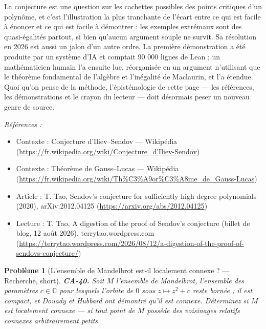 \documentclass[11pt]{article}
\newtheorem{problem}{Problème}
\newenvironment{refs}{\par\small\noindent\emph{Références :}\begin{itemize}\setlength\itemsep{0pt}}{\end{itemize}\normalsize}
\begin{document}
\noindent La conjecture est une question sur les cachettes possibles des points critiques
d'un polynôme, et c'est l'illustration la plus tranchante de l'écart entre ce qui est facile à
énoncer et ce qui est facile à démontrer : les exemples extrémaux sont des quasi-égalités partout,
si bien qu'aucun argument souple ne survit. Sa résolution en 2026 est aussi un jalon d'un autre
ordre. La première démonstration a été produite par un système d'IA et comptait 90 000 lignes de
Lean ; un mathématicien humain l'a ensuite lue, réorganisée en un argument n'utilisant que le
théorème fondamental de l'algèbre et l'inégalité de Maclaurin, et l'a étendue. Quoi qu'on pense de
la méthode, l'épistémologie de cette page --- les références, les démonstrations et le crayon du
lecteur --- doit désormais peser un nouveau genre de source.

\begin{refs}
\item Contexte : Conjecture d'Iliev--Sendov --- Wikipédia (\url{https://fr.wikipedia.org/wiki/Conjecture_d'Iliev-Sendov})
\item Contexte : Théorème de Gauss--Lucas --- Wikipédia (\url{https://fr.wikipedia.org/wiki/Th%C3%A9or%C3%A8me_de_Gauss-Lucas})
\item Article : T. Tao, \og{} Sendov's conjecture for sufficiently high degree polynomials \fg{} (2020), arXiv:2012.04125 (\url{https://arxiv.org/abs/2012.04125})
\item Lecture : T. Tao, \og{} A digestion of the proof of Sendov's conjecture \fg{} (billet de blog, 12 août 2026), terrytao.wordpress.com (\url{https://terrytao.wordpress.com/2026/08/12/a-digestion-of-the-proof-of-sendovs-conjecture/})
\end{refs}

\bigskip

\begin{problem}[{L'ensemble de Mandelbrot est-il localement connexe ? --- Recherche, short}]
\textbf{CA-40.} Soit $ M $ l'ensemble de Mandelbrot, l'ensemble des
paramètres $ c \in \mathbb{C} $ pour lesquels l'orbite de $ 0 $ sous $ z \mapsto z^2 + c $
reste bornée ; il est compact, et Douady et Hubbard ont démontré qu'il est connexe. Déterminez si
$ M $ est \textit{localement connexe} --- si tout point de $ M $ possède des voisinages relatifs
connexes arbitrairement petits.
\end{problem}
\end{document}
